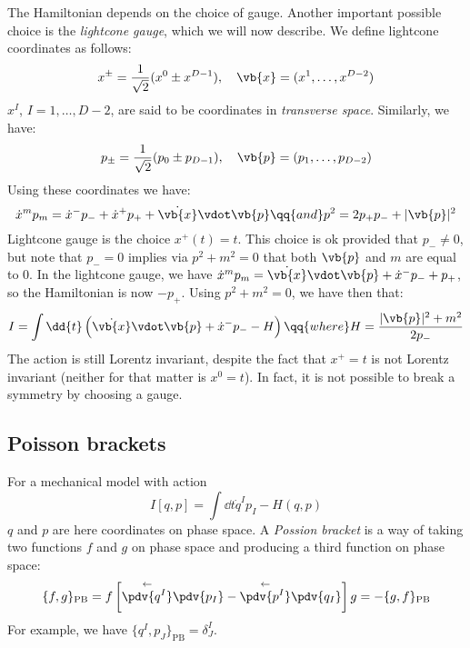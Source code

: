 \documentclass{jknotes}
\begin{document}
The Hamiltonian depends on the choice of gauge. Another important possible choice is the \emph{lightcone gauge}, which we will now describe. We define lightcone coordinates as follows:
\begin{equation}
    x^\pm = \frac{1}{\sqrt{2}}(x^0\pm x^{D-1}),\quad \vb{x} = (x^1,\dots,x^{D-2})
\end{equation}
\(x^I\), \(I=1,\dots,D-2\), are said to be coordinates in \emph{transverse space}. Similarly, we have:
\begin{equation}
    p_\pm = \frac{1}{\sqrt{2}} (p_0\pm p_{D-1}),\quad \vb{p} = (p_1,\dots,p_{D-2})
\end{equation}
Using these coordinates we have:
\begin{equation}
    \dot{x}^mp_m = \dot{x}^-p_- + \dot{x}^+p_+ + \dot{\vb{x}}\vdot \vb{p}
    \qq{and}
    p^2 = 2p_+p_- + |\vb{p}|^2
\end{equation}
Lightcone gauge is the choice \(x^+(t)=t\). This choice is ok provided that \(p_-\ne0\), but note that \(p_-=0\) implies via \(p^2+m^2=0\) that both \(\vb{p}\) and \(m\) are equal to \(0\). In the lightcone gauge, we have \(\dot{x}^mp_m = \dot{\vb{x}}\vdot\vb{p} + \dot{x}^-p_- + p_+\), so the Hamiltonian is now \(-p_+\). Using \(p^2+m^2=0\), we have then that:
\begin{equation}
    I = \int\dd{t}\left( \dot{\vb{x}}\vdot\vb{p} + \dot{x}^-p_- - H \right) \qq{where} H = \frac{|\vb{p}|^2+m^2}{2p_-}
\end{equation}
The action is still Lorentz invariant, despite the fact that \(x^+=t\) is not Lorentz invariant (neither for that matter is \(x^0=t\)). In fact, it is not possible to break a symmetry by choosing a gauge.

\subsection{Poisson brackets}
For a mechanical model with action
\begin{equation}
    I[q,p] = \int\dd{t}\dot{q}^Ip_I - H(q,p)
\end{equation}
\(q\) and \(p\) are here coordinates on phase space. A \emph{Possion bracket} is a way of taking two functions \(f\) and \(g\) on phase space and producing a third function on phase space:
\begin{equation}
    \{f,g\}_{\text{PB}} = f \left[ \overset{\leftarrow}{\pdv{q^I}}\pdv{p_I} - \overset{\leftarrow}{\pdv{p^I}}\pdv{q_I} \right] g = -\{g,f\}_{\text{PB}}
\end{equation}
For example, we have \(\{q^I,p_J\}_{\text{PB}} = \delta^I_J\).
\end{document}
